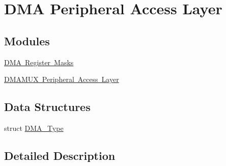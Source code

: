 \hypertarget{group___d_m_a___peripheral___access___layer}{}\section{D\+MA Peripheral Access Layer}
\label{group___d_m_a___peripheral___access___layer}
\subsection*{Modules}
\begin{DoxyCompactItemize}
\item 
\mbox{\hyperlink{group___d_m_a___register___masks}{D\+M\+A Register Masks}}
\item 
\mbox{\hyperlink{group___d_m_a_m_u_x___peripheral___access___layer}{D\+M\+A\+M\+U\+X Peripheral Access Layer}}
\end{DoxyCompactItemize}
\subsection*{Data Structures}
\begin{DoxyCompactItemize}
\item 
struct \mbox{\hyperlink{struct_d_m_a___type}{D\+M\+A\+\_\+\+Type}}
\end{DoxyCompactItemize}


\subsection{Detailed Description}
